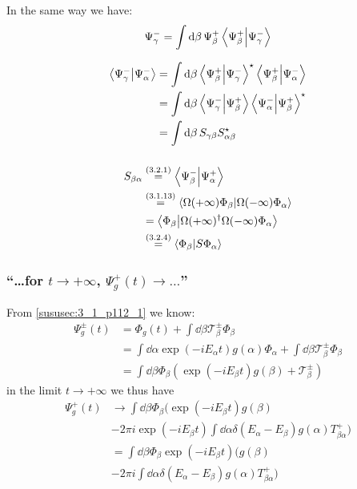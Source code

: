 In the same way we have:
\[\Psi_\gamma^-=\int\dd{\beta}\Psi_\beta^+\innerproduct{\Psi_\beta^+}{\Psi_\gamma^-}\]

\begin{align*}
	\innerproduct{\Psi_\gamma^-}{\Psi_\alpha^-}&=
	\int\dd{\beta}\innerproduct{\Psi_\beta^+}{\Psi_\gamma^-}^\star \innerproduct{\Psi_\beta^+}{\Psi_\alpha^-}\\
	&=\int\dd{\beta}\innerproduct{\Psi_\gamma^-}{\Psi_\beta^+} \innerproduct{\Psi_\alpha^-}{\Psi_\beta^+}^\star\\
	&=\int\dd{\beta} S_{\gamma\beta} S_{\alpha\beta}^\star
\end{align*}


\subsubsection{ }
\begin{align*}
	S_{\beta\alpha}&\overset{\eqc{3.2.1}}{=}\innerproduct{\Psi_\beta^-}{\Psi_\alpha^+}\\
	&\overset{\eqc{3.1.13}}{=}\innerproduct{\Omega(+\infty)\Phi_\beta}{\Omega(-\infty)\Phi_\alpha}\\
	&=\innerproduct{\Phi_\beta}{\Omega(+\infty)^\dagger\Omega(-\infty)\Phi_\alpha}\\
	&\overset{\eqc{3.2.4}}{=}\innerproduct{\Phi_\beta}{S\Phi_\alpha}
\end{align*}


\subsubsection{\enquote{\dots for $t\rightarrow+\infty$, $\Psi^+_g(t)\rightarrow\dots$} }

From \ref{sususec:3_1_p112_1} we know:
\begin{align*}
	\Psi^\pm_g(t)&=\Phi_g(t)+\int \dd{\beta} \mathcal{T}^\pm_\beta \Phi_\beta\\
	&=\int \dd{\alpha} \exp(-iE_\alpha t) g(\alpha) \Phi_\alpha
	+\int \dd{\beta} \mathcal{T}^\pm_\beta \Phi_\beta\\
	&=\int \dd{\beta} \Phi_\beta \left(\exp(-iE_\beta t) g(\beta)+\mathcal{T}^\pm_\beta\right)
\end{align*}
in the limit $t\rightarrow+\infty$ we thus have
\begin{align*}
	\Psi^+_g(t)&\rightarrow \int \dd{\beta} \Phi_\beta (\exp(-iE_\beta t) g(\beta)\\
	&-2 \pi i \exp(-iE_\beta t)\int\dd{\alpha} \delta (E_\alpha-E_\beta) g(\alpha)T_{\beta\alpha}^+)\\
	&=\int \dd{\beta} \Phi_\beta\exp(-iE_\beta t) ( g(\beta)\\
	&-2 \pi i \int\dd{\alpha} \delta (E_\alpha-E_\beta) g(\alpha)T_{\beta\alpha}^+)
\end{align*}


